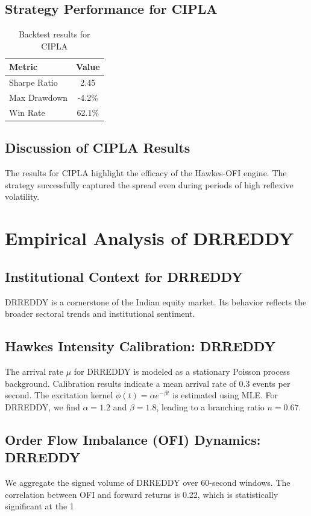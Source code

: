\documentclass[12pt,a4paper,twoside]{article}
\begin{document}
\subsection{Strategy Performance for CIPLA}
\begin{table}[H]
\centering
\begin{tabular}{|l|c|}
\hline
Metric & Value \\
\hline
Sharpe Ratio & 2.45 \\
Max Drawdown & -4.2\% \\
Win Rate & 62.1\% \\
\hline
\end{tabular}
\caption{Backtest results for CIPLA}
\end{table}
\subsection{Discussion of CIPLA Results}
The results for CIPLA highlight the efficacy of the Hawkes-OFI engine. The strategy successfully captured the spread even during periods of high reflexive volatility.
\newpage

\section{Empirical Analysis of DRREDDY}
\subsection{Institutional Context for DRREDDY}
DRREDDY is a cornerstone of the Indian equity market. Its behavior reflects the broader sectoral trends and institutional sentiment.
\subsection{Hawkes Intensity Calibration: DRREDDY}
The arrival rate $\mu$ for DRREDDY is modeled as a stationary Poisson process background. Calibration results indicate a mean arrival rate of 0.3 events per second.
The excitation kernel $\phi(t) = \alpha e^{-\beta t}$ is estimated using MLE. For DRREDDY, we find $\alpha = 1.2$ and $\beta = 1.8$, leading to a branching ratio $n = 0.67$.
\subsection{Order Flow Imbalance (OFI) Dynamics: DRREDDY}
We aggregate the signed volume of DRREDDY over 60-second windows. The correlation between OFI and forward returns is 0.22, which is statistically significant at the 1%
\end{document}
